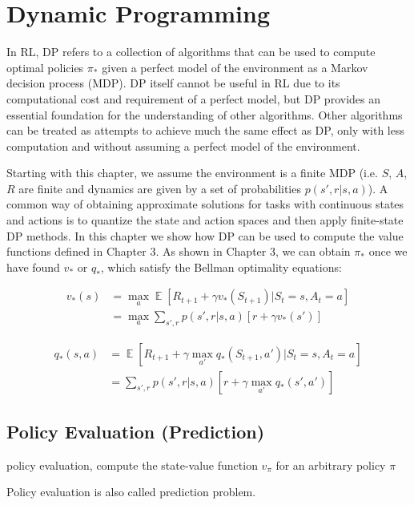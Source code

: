 \documentclass[lang=en,mode=geye,device=normal,color=blue,14pt]{elegantnote}
\DeclareMathOperator*{\E}{\mathbb{E}}
\DeclareMathOperator*{\1}{\mathbbm{1}}
\begin{document}
\newpage
\section{Dynamic Programming}

In RL, DP refers to a collection of algorithms that can be used to compute optimal policies $\pi_*$ given a perfect model of the environment as a Markov decision process (MDP).
DP itself cannot be useful in RL due to its computational cost and requirement of a perfect model, but DP provides an essential foundation for the understanding of other algorithms.
Other algorithms can be treated as attempts to achieve much the same effect as DP, only with less computation and without assuming a perfect model of the environment.

Starting with this chapter, we assume the environment is a finite MDP (i.e. $S$, $A$, $R$ are finite and dynamics are given by a set of probabilities $p(s',r|s,a)$).
A common way of obtaining approximate solutions for tasks with continuous states and actions is to quantize the state and action spaces and then apply finite-state DP methods.
In this chapter we show how DP can be used to compute the value functions defined in Chapter 3. As shown in Chapter 3, we can obtain $\pi_*$ once we have found $v_*$ or $q_*$, which satisfy the Bellman optimality equations:

\begin{align*}
v_*(s) & = \max_a \E [R_{t+1} + \gamma v_*(S_{t+1}) | S_t = s, A_t = a] \\
& = \max_a \sum_{s',r} p(s',r|s,a)[r + \gamma v_*(s')]
\end{align*}

\begin{align*}
q_*(s,a) & = \E [R_{t+1} + \gamma \max_{a'} q_*(S_{t+1},a') | S_t = s, A_t = a] \\
& = \sum_{s',r} p(s',r|s,a)[r+\gamma \max_{a'} q_*(s',a')]
\end{align*}

\subsection{Policy Evaluation (Prediction)}
\begin{definition}
policy evaluation, compute the state-value function $v_\pi$ for an arbitrary policy $\pi$
\end{definition}

Policy evaluation is also called prediction problem.
\end{document}
